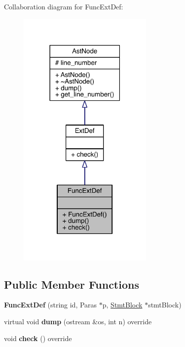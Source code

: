 Collaboration diagram for Func\+Ext\+Def\+:\nopagebreak
\begin{figure}[H]
\begin{center}
\leavevmode
\includegraphics[width=186pt]{class_func_ext_def__coll__graph}
\end{center}
\end{figure}
\subsection*{Public Member Functions}
\begin{DoxyCompactItemize}
\item 
\mbox{\label{class_func_ext_def_aa937c117fe72eae933276738f7406ceb}} 
{\bfseries Func\+Ext\+Def} (string id, Paras $\ast$p, \hyperlink{class_stmt_block}{Stmt\+Block} $\ast$stmt\+Block)
\item 
\mbox{\label{class_func_ext_def_a24f3b7f5d389ac97bea09c5b7332ce03}} 
virtual void {\bfseries dump} (ostream \&os, int n) override
\item 
\mbox{\label{class_func_ext_def_ac768526c6373721de90662322ccc1470}} 
void {\bfseries check} () override
\end{DoxyCompactItemize}
